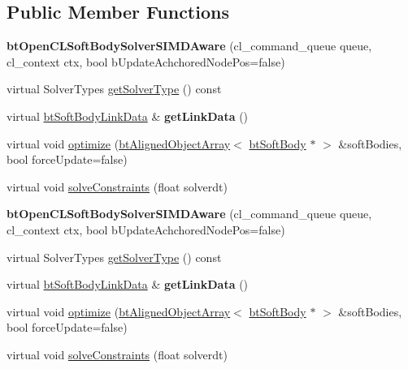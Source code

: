 \subsection*{Public Member Functions}
\begin{DoxyCompactItemize}
\item 
\mbox{\label{classbtOpenCLSoftBodySolverSIMDAware_a11f6c0929b49baf2f98578b39559938c}} 
{\bfseries bt\+Open\+C\+L\+Soft\+Body\+Solver\+S\+I\+M\+D\+Aware} (cl\+\_\+command\+\_\+queue queue, cl\+\_\+context ctx, bool b\+Update\+Achchored\+Node\+Pos=false)
\item 
virtual Solver\+Types \hyperlink{classbtOpenCLSoftBodySolverSIMDAware_a34d8e98c8756aeeac24554c18f06c0c1}{get\+Solver\+Type} () const
\item 
\mbox{\label{classbtOpenCLSoftBodySolverSIMDAware_a9b57b562c8509de2dab95c70e1ba333a}} 
virtual \hyperlink{classbtSoftBodyLinkData}{bt\+Soft\+Body\+Link\+Data} \& {\bfseries get\+Link\+Data} ()
\item 
virtual void \hyperlink{classbtOpenCLSoftBodySolverSIMDAware_ad1052da1c0e61eac7d9fe1df618c150c}{optimize} (\hyperlink{classbtAlignedObjectArray}{bt\+Aligned\+Object\+Array}$<$ \hyperlink{classbtSoftBody}{bt\+Soft\+Body} $\ast$ $>$ \&soft\+Bodies, bool force\+Update=false)
\item 
virtual void \hyperlink{classbtOpenCLSoftBodySolverSIMDAware_a38d944c9dcaa0579e001f93da1b5244d}{solve\+Constraints} (float solverdt)
\item 
\mbox{\label{classbtOpenCLSoftBodySolverSIMDAware_a11f6c0929b49baf2f98578b39559938c}} 
{\bfseries bt\+Open\+C\+L\+Soft\+Body\+Solver\+S\+I\+M\+D\+Aware} (cl\+\_\+command\+\_\+queue queue, cl\+\_\+context ctx, bool b\+Update\+Achchored\+Node\+Pos=false)
\item 
virtual Solver\+Types \hyperlink{classbtOpenCLSoftBodySolverSIMDAware_a34d8e98c8756aeeac24554c18f06c0c1}{get\+Solver\+Type} () const
\item 
\mbox{\label{classbtOpenCLSoftBodySolverSIMDAware_a0e142eaab37905b8dcf9aa1e97ebf974}} 
virtual \hyperlink{classbtSoftBodyLinkData}{bt\+Soft\+Body\+Link\+Data} \& {\bfseries get\+Link\+Data} ()
\item 
virtual void \hyperlink{classbtOpenCLSoftBodySolverSIMDAware_a5b9fb1bbf50012e83d8e2c38c5fc2afb}{optimize} (\hyperlink{classbtAlignedObjectArray}{bt\+Aligned\+Object\+Array}$<$ \hyperlink{classbtSoftBody}{bt\+Soft\+Body} $\ast$ $>$ \&soft\+Bodies, bool force\+Update=false)
\item 
virtual void \hyperlink{classbtOpenCLSoftBodySolverSIMDAware_aac2e9d5582da958b0943b6e04f7f4c5a}{solve\+Constraints} (float solverdt)
\end{DoxyCompactItemize}
